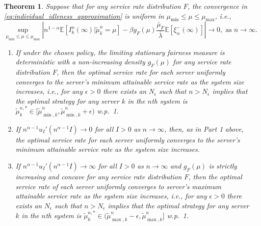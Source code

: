 \documentclass[a4paper,11pt,twoside]{article}
\numberwithin{equation}{section}
\numberwithin{figure}{section}
\theoremstyle{plain}
\newtheorem{theorem}{Theorem}[section]
\newcommand{\EE}{\mathbb{E}}
\newcommand{\1}{\mathbbm{1}}
\begin{document}
\begin{theorem}\label{thm:best_response_scaling}
Suppose that for any service rate distribution $F$, the convergence in \eqref{eq:individual_idleness_approximation} is uniform in $\mu_{\min}\leq \mu\leq \mu_{\max}$, i.e.,
\begin{equation}\label{eq:uniform_conv_assumption}
   \sup_{\mu_{\min}\leq \mu \leq \mu_{\max}}\left|n^{1-\alpha}\EE[I_k^n(\infty)|\tilde{\mu}_k^n=\mu]-\beta g_F(\mu)\frac{\bar{\mu}_F}{\bar{\lambda}}\EE[\xi_\alpha^{-}(\infty)]\right|\to 0, \mbox{ as }n\to\infty.  
\end{equation}

\begin{enumerate}
    \item If under the chosen policy, the limiting stationary fairness measure is deterministic with a non-increasing density $g_F(\mu)$ for any service rate distribution $F$, then the optimal service rate for each server uniformly converges to the server's minimum attainable service rate as the system size increases, i.e., for any $\epsilon>0$ there exists an $N_\epsilon$ such that $n>N_\epsilon$ implies that the optimal strategy for any server $k$ in the $n$th system is $\tilde{\mu}_k^{n,*}\in[\tilde{\mu}_{\min,k}^n,\tilde{\mu}_{\min,k}^n+\epsilon)$ w.p.~1.
    
    \item If $n^{\alpha-1}u_I'(n^{\alpha-1}I)\to 0$ for all $I>0$ as $n\to \infty$, then, as in Part 1 above, the optimal service rate for each server uniformly converges to the server's minimum attainable service rate as the system size increases. 

    \item If  $n^{\alpha-1}u_I'(n^{\alpha-1}I)\to \infty$ for all $I>0$ as $n\to \infty$ and $g_F(\mu)$ is strictly increasing and concave for any service rate distribution $F$, then the optimal service rate of each server uniformly converges to server's maximum attainable service rate as the system size increases, i.e., for any $\epsilon>0$ there exists an $N_\epsilon$ such that $n>N_\epsilon$ implies that the optimal strategy for any server $k$ in the $n$th system is $\tilde{\mu}_k^{n,*}\in(\tilde{\mu}_{\max,k}^n-\epsilon,\tilde{\mu}_{\max,k}^n]$ w.p.~1.
\end{enumerate}
\end{theorem}
\end{document}
